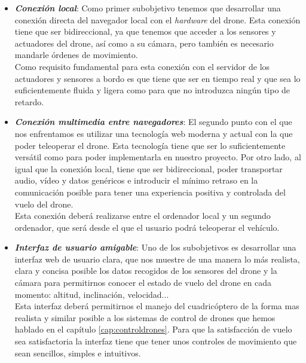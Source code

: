 \begin{itemize}


\item \emph{\textbf{Conexión local}}: Como primer subobjetivo tenemos que desarrollar una conexión directa del navegador local con el \emph{hardware} del drone. Esta conexión tiene que ser bidireccional, ya que tenemos que acceder a los sensores y actuadores del drone, así como a su cámara, pero también es necesario mandarle órdenes de movimiento.\\

Como requisito fundamental para esta conexión con el servidor de los actuadores y sensores a bordo es que tiene que ser en tiempo real y que sea lo suficientemente fluida y ligera como para que no introduzca ningún tipo de retardo.\\


\item \emph{\textbf{Conexión multimedia entre navegadores}}: El segundo punto con el que nos enfrentamos es utilizar una tecnología web moderna y actual con la que poder teleoperar el drone. Esta tecnología tiene que ser lo suficientemente versátil como para poder implementarla en nuestro proyecto. Por otro lado, al igual que la conexión local, tiene que ser bidireccional, poder transportar audio, vídeo y datos genéricos e introducir el mínimo retraso en la comunicación posible para tener una experiencia positiva y controlada del vuelo del drone.\\

Esta conexión deberá realizarse entre el ordenador local y un segundo ordenador, que será desde el que el usuario podrá teleoperar el vehículo.\\


\item \emph{\textbf{Interfaz de usuario amigable}}: Uno de los subobjetivos es desarrollar una interfaz web de usuario clara, que nos muestre de una manera lo más realista, clara y concisa posible los datos recogidos de los sensores del drone y la cámara para permitirnos conocer el estado de vuelo del drone en cada momento: altitud, inclinación, velocidad...\\

Esta interfaz deberá permitirnos el manejo del cuadricóptero de la forma mas realista y similar posible a los sistemas de control de drones que hemos hablado en el capítulo \ref{cap:controldrones}. Para que la satisfacción de vuelo sea satisfactoria la interfaz tiene que tener unos controles de movimiento que sean sencillos, simples e intuitivos.\\

\end{itemize}


